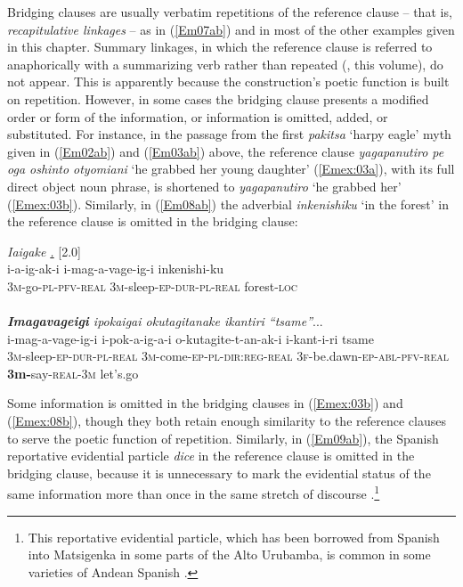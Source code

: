 \documentclass[output=paper]{LSP/langsci}
\begin{document}
 
Bridging clauses are usually verbatim repetitions of the reference clause – that is, \textit{recapitulative linkages} – as in (\ref{Em07ab}) and in most of the other examples given in this chapter. Summary linkages, in which the reference clause is referred to anaphorically with a summarizing verb rather than repeated (\citeauthor{guerin18}, this volume), do not appear. This is apparently because the construction’s poetic function is built on repetition. However, in some cases the bridging clause presents a modified order or form of the information, or information is omitted, added, or substituted. For instance, in the passage from the first \textit{pakitsa} `harpy eagle' myth given in (\ref{Em02ab}) and (\ref{Em03ab}) above, the reference clause \textit{yagapanutiro pe oga oshinto otyomiani} `he grabbed her young daughter' (\ref{Emex:03a}), with its full direct object noun phrase, is shortened to \textit{yagapanutiro} `he grabbed her' (\ref{Emex:03b}). Similarly, in (\ref{Em08ab}) the adverbial \textit{inkenishiku} `in the forest' in the reference clause is omitted in the bridging clause:

\begin{exe}
\ex \label{Em08ab}
\begin{xlist}
\ex \label{Emex:08a}
\glt \textit{Iaigake \underline{.}} [2.0]\\
\gll i-a-ig-ak-i i-mag-a-vage-ig-i inkenishi-ku \\
 \textsc{3m-}go\textsc{-pl-pfv-real} \textsc{3m-}sleep\textsc{-ep-dur-pl-real} forest\textsc{-loc}\\
\glt {}\\
\ex \label{Emex:08b}
\glt \textit{\textbf{Imagavageigi} ipokaigai okutagitanake ikantiri ``tsame''}...\\
\gll i-mag-a-vage-ig-i i-pok-a-ig-a-i o-kutagite-t-an-ak-i i-kant-i-ri tsame\\     	      
   \textsc{3m-}sleep\textsc{-ep-dur-pl-real} \textsc{3m-}come\textsc{-ep-pl-dir:reg-real} \textsc{3f-}be.dawn\textsc{-ep-abl-pfv-real} \textbf{3m-}say\textsc{-real-3m} let’s.go\\
\glt {}
\end{xlist}
\end{exe}


%
Some information is omitted in the bridging clauses in (\ref{Emex:03b}) and (\ref{Emex:08b}), though they both retain enough similarity to the reference clauses to serve the poetic function of repetition. Similarly, in (\ref{Em09ab}), the Spanish reportative evidential particle \textit{dice} in the reference clause is omitted in the bridging clause, because it is unnecessary to mark the evidential status of the same information more than once in the same stretch of discourse \citep[for a similar case in Sunwar, see][392]{schulze73}.\footnote{This reportative evidential particle, which has been borrowed from Spanish into Matsigenka in some parts of the Alto Urubamba, is common in some varieties of Andean Spanish \citep[as well as its variant \textit{dizque}; see][]{babel.2009}.} 
\end{document}
